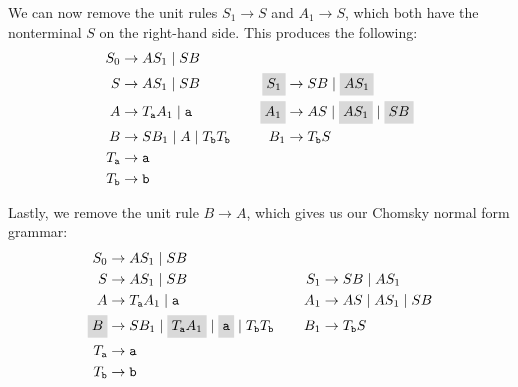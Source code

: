 \begin{example}
\begin{enumerate}
We can now remove the unit rules $S_{1} \rightarrow S$ and $A_{1} \rightarrow S$, which both have the nonterminal $S$ on the right-hand side. This produces the following:
\begin{equation*}
\begin{aligned}[t]
S_{0}					&\rightarrow AS_{1} \mid SB \\
S						&\rightarrow AS_{1} \mid SB \phantom{\highlightmath{S_{0}}} \\
A						&\rightarrow T_{\texttt{a}}A_{1} \mid \texttt{a} \phantom{\highlightmath{S_{0}}} \\
B						&\rightarrow SB_{1} \mid A \mid T_{\texttt{b}}T_{\texttt{b}} \\
T_{\texttt{a}}				&\rightarrow \texttt{a} \\
T_{\texttt{b}}				&\rightarrow \texttt{b}
\end{aligned}
\hspace{0.75cm}
\begin{aligned}[t]
\phantom{S_{0}} & \\
\highlightmath{S_{1}}			&\rightarrow SB \mid \highlightmath{AS_{1}} \\
\highlightmath{A_{1}}			&\rightarrow AS \mid \highlightmath{AS_{1}} \mid \highlightmath{SB} \\
B_{1}					&\rightarrow T_{\texttt{b}}S
\end{aligned}
\end{equation*}

Lastly, we remove the unit rule $B \rightarrow A$, which gives us our Chomsky normal form grammar:
\begin{equation*}
\begin{aligned}[t]
S_{0}					&\rightarrow AS_{1} \mid SB \\
S						&\rightarrow AS_{1} \mid SB\\
A						&\rightarrow T_{\texttt{a}}A_{1} \mid \texttt{a} \\
\highlightmath{B}			&\rightarrow SB_{1} \mid \highlightmath{T_{\texttt{a}}A_{1}} \mid \highlightmath{\texttt{a}} \mid T_{\texttt{b}}T_{\texttt{b}} \\
T_{\texttt{a}}				&\rightarrow \texttt{a} \\
T_{\texttt{b}}				&\rightarrow \texttt{b}
\end{aligned}
\hspace{0.75cm}
\begin{aligned}[t]
\phantom{S_{0}} & \\
S_{1}					&\rightarrow SB \mid AS_{1} \\
A_{1}					&\rightarrow AS \mid AS_{1} \mid SB \\
B_{1}					&\rightarrow T_{\texttt{b}}S \phantom{\highlightmath{S_{0}}}
\end{aligned}
\end{equation*}
\end{enumerate}
\end{example}

